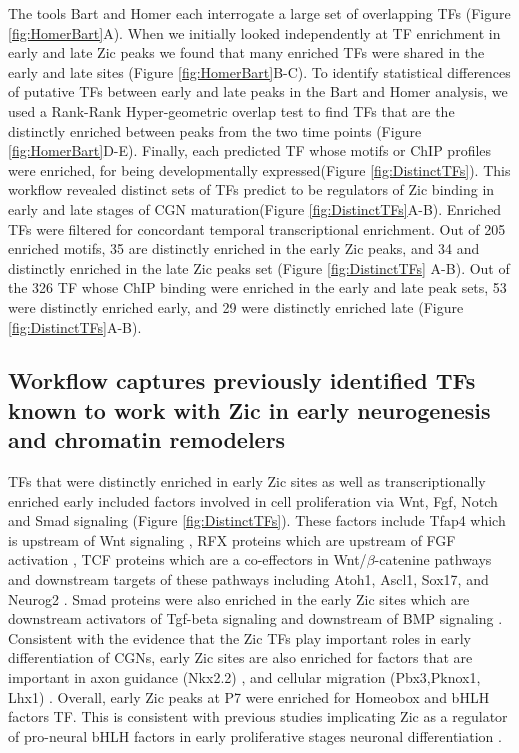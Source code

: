\documentclass[fleqn,10pt]{wlscirep}
\begin{document}
The tools Bart and Homer each interrogate a large set of overlapping TFs (Figure \ref{fig:HomerBart}A). When we initially looked  independently at TF enrichment in early and late Zic peaks we found that many enriched TFs were shared in the early and late sites (Figure \ref{fig:HomerBart}B-C).  To identify statistical differences of putative TFs between early and late peaks in the Bart and Homer analysis, we used a Rank-Rank Hyper-geometric  overlap test to find TFs that are the distinctly enriched between peaks from the two time points (Figure \ref{fig:HomerBart}D-E). Finally, each predicted TF whose motifs or ChIP profiles were enriched, for being developmentally expressed(Figure \ref{fig:DistinctTFs}). This workflow revealed distinct sets of TFs predict to be regulators of Zic binding in early and late stages of CGN maturation(Figure \ref{fig:DistinctTFs}A-B). Enriched TFs were filtered for concordant temporal transcriptional enrichment. Out of 205 enriched motifs, 35 are distinctly enriched in the early Zic peaks, and 34 and distinctly enriched in the late Zic peaks set (Figure \ref{fig:DistinctTFs} A-B). Out of the 326 TF whose ChIP binding were enriched in the early and late peak sets, 53 were distinctly enriched early, and 29 were distinctly enriched late (Figure \ref{fig:DistinctTFs}A-B).  

\subsection*{Workflow captures previously identified TFs known to work with Zic in early neurogenesis and chromatin remodelers}
TFs that were distinctly enriched in early Zic sites as well as transcriptionally enriched early included factors involved in cell proliferation via Wnt, Fgf, Notch and Smad signaling (Figure \ref{fig:DistinctTFs}). These factors include Tfap4 which is upstream  of Wnt signaling \cite{Medina-Martinez2020TheDevelopment, Song2018TranscriptionCarcinoma}, RFX proteins which are upstream of FGF activation \cite{Hsu2012CiliogenicPromoter}, TCF proteins \cite{Shy2013RegulationSignaling} which are a co-effectors in  Wnt/$\beta$-catenine pathways and downstream targets of these pathways including  Atoh1, Ascl1, Sox17, and Neurog2 \cite{Dennis2019BHLHReprogramming, Zhu2019pBCL11ACancer/p, Lacomme2012NEUROG2Cycle, Katoh2018MultilayeredReview, Lebensohn2016ComparativeSignaling}. Smad proteins were also enriched in the early Zic sites which are downstream activators of Tgf-beta signaling and downstream of BMP signaling \cite{Liu2021SMAD4Pathways, Nickel2019SpecificationSignaling,Derynck2003Smad-dependentSignalling}. Consistent with the evidence that the Zic TFs play important roles in early differentiation of CGNs, early Zic sites are also enriched for factors that are important in axon guidance (Nkx2.2) \cite{}, and cellular migration (Pbx3,Pknox1, Lhx1) \cite{}. Overall, early Zic peaks at P7 were enriched for Homeobox and bHLH factors TF. This is consistent with previous studies implicating Zic as a regulator of pro-neural bHLH factors in early proliferative stages neuronal differentiation \cite{Aruga2018ZicDisease}.
\end{document}
